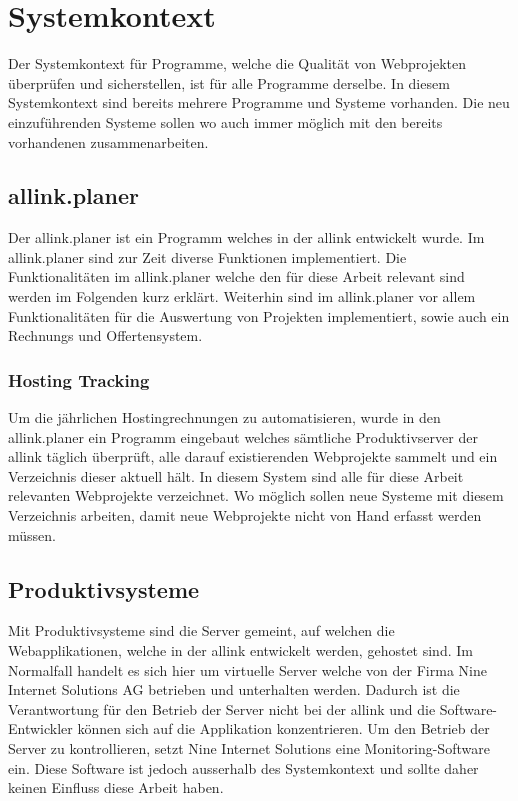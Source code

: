 
 \setcounter{anumber}{0}
\renewcommand\theanumber{A\arabic{anumber}}
\newcommand{\newanumber}[3]%
{%
\midrule%
\refstepcounter{anumber}\label{a:#1}%
\theanumber & #2 & #3 \\
}


\section{Systemkontext}
\label{sec:systemkontext}
Der Systemkontext für Programme, welche die Qualität von Webprojekten überprüfen und sicherstellen, ist für alle Programme derselbe. In diesem Systemkontext sind bereits mehrere Programme und Systeme vorhanden. Die neu einzuführenden Systeme sollen wo auch immer möglich mit den bereits vorhandenen zusammenarbeiten.

\subsection{allink.planer}
\label{sub:allink_planer}
Der allink.planer ist ein Programm welches in der allink entwickelt wurde. Im allink.planer sind zur Zeit diverse Funktionen implementiert. Die Funktionalitäten im allink.planer welche den für diese Arbeit relevant sind werden im Folgenden kurz erklärt. Weiterhin sind im allink.planer vor allem Funktionalitäten für die Auswertung von Projekten implementiert, sowie auch ein Rechnungs und Offertensystem.

\subsubsection{Hosting Tracking}
\label{ssub:hosting_tracking}
Um die jährlichen Hostingrechnungen zu automatisieren, wurde in den allink.planer ein Programm eingebaut welches sämtliche Produktivserver der allink täglich überprüft, alle darauf existierenden Webprojekte sammelt und ein Verzeichnis dieser aktuell hält. In diesem System sind alle für diese Arbeit relevanten Webprojekte verzeichnet. Wo möglich sollen neue Systeme mit diesem Verzeichnis arbeiten, damit neue Webprojekte nicht von Hand erfasst werden müssen.

\subsection{Produktivsysteme}
\label{sub:produktivsysteme}
Mit Produktivsysteme sind die Server gemeint, auf welchen die Webapplikationen, welche in der allink entwickelt werden, gehostet sind. Im Normalfall handelt es sich hier um virtuelle Server welche von der Firma Nine Internet Solutions AG betrieben und unterhalten werden. Dadurch ist die Verantwortung für den Betrieb der Server nicht bei der allink und die Software-Entwickler können sich auf die Applikation konzentrieren. Um den Betrieb der Server zu kontrollieren, setzt Nine Internet Solutions eine Monitoring-Software ein. Diese Software ist jedoch ausserhalb des Systemkontext und sollte daher keinen Einfluss diese Arbeit haben.

